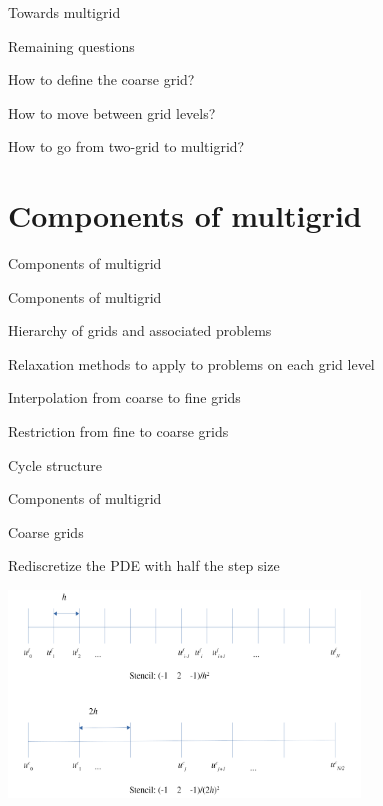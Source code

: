 \documentclass[18pt,xcolor=table]{beamer}
\begin{document}
\begin{frame}{Towards multigrid}
\begin{block}{Remaining questions}
\bit
\item How to define the coarse grid?
\item How to move between grid levels?
\item How to go from two-grid to multigrid?
\eit
\end{block}
\end{frame}


\section{Components of multigrid}

\begin{frame}{Components of multigrid}
\begin{block}{Components of multigrid}
\bit
\item Hierarchy of grids and associated problems
\item Relaxation methods to apply to problems on each grid level
\item Interpolation from coarse to fine grids
\item Restriction from fine to coarse grids
\item Cycle structure
\eit
\end{block}
\end{frame}

\begin{frame}{Components of multigrid}
\begin{block}{Coarse grids}
\bit
\item Rediscretize the PDE with half the step size
\eit
\end{block}
\begin{center}
\includegraphics[width=0.7\textwidth]{../figures/coarse1DFDPoisson}
\end{center}
\end{frame}
\end{document}
